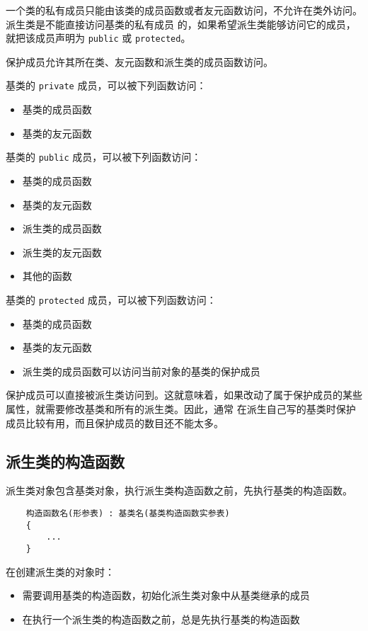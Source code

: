 \documentclass[UTF8]{ctexart}
\begin{document}
一个类的私有成员只能由该类的成员函数或者友元函数访问，不允许在类外访问。派生类是不能直接访问基类的私有成员
的，如果希望派生类能够访问它的成员，就把该成员声明为 \texttt{public} 或 \texttt{protected}。

保护成员允许其所在类、友元函数和派生类的成员函数访问。

基类的 \texttt{private} 成员，可以被下列函数访问：
\begin{itemize}
    \item 基类的成员函数
    \item 基类的友元函数
\end{itemize}

基类的 \texttt{public} 成员，可以被下列函数访问：
\begin{itemize}
    \item 基类的成员函数
    \item 基类的友元函数
    \item 派生类的成员函数
    \item 派生类的友元函数
    \item 其他的函数
\end{itemize}

基类的 \texttt{protected} 成员，可以被下列函数访问：
\begin{itemize}
    \item 基类的成员函数
    \item 基类的友元函数
    \item 派生类的成员函数可以访问当前对象的基类的保护成员
\end{itemize}

保护成员可以直接被派生类访问到。这就意味着，如果改动了属于保护成员的某些属性，就需要修改基类和所有的派生类。因此，通常
在派生自己写的基类时保护成员比较有用，而且保护成员的数目还不能太多。

\subsection{派生类的构造函数}
派生类对象包含基类对象，执行派生类构造函数之前，先执行基类的构造函数。

\begin{verbatim}
    构造函数名(形参表) : 基类名(基类构造函数实参表)
    {
        ...
    }
\end{verbatim}

在创建派生类的对象时：
\begin{itemize}
    \item 需要调用基类的构造函数，初始化派生类对象中从基类继承的成员
    \item 在执行一个派生类的构造函数之前，总是先执行基类的构造函数
\end{itemize}
\end{document}
